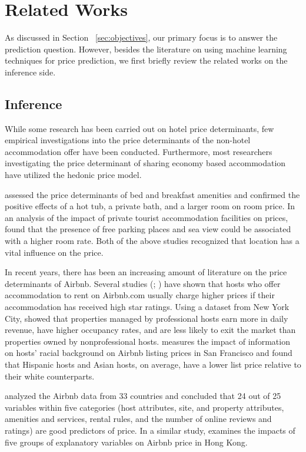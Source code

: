 \section{Related Works}

As discussed in Section ~\ref{sec:objectives}, our primary focus is to answer
the prediction question. However, besides the literature on using machine
learning techniques for price prediction, we first briefly review the related
works on the inference side.

\subsection{Inference}

While some research has been carried out on hotel price determinants, few
empirical investigations into the price determinants of the non-hotel
accommodation offer have been conducted.  Furthermore, most researchers
investigating the price determinant of sharing economy based accommodation have
utilized the hedonic price model.

\textcite{monty2003hedonic} assessed the price determinants of bed and breakfast
amenities and confirmed the positive effects of a hot tub, a private bath, and a
larger room on room price.  In an analysis of the impact of private tourist
accommodation facilities on prices, \textcite{portolan2013impact} found that the
presence of free parking places and sea view could be associated with a higher
room rate.  Both of the above studies recognized that location has a vital
influence on the price.

In recent years, there has been an increasing amount of literature on the price
determinants of Airbnb.  Several studies (\textcite{gutt2015sharing};
\textcite{ikkala2014defining} ) have shown that hosts who offer accommodation to
rent on Airbnb.com usually charge higher prices if their accommodation has
received high star ratings.  Using a dataset from New York City,
\textcite{li2016pros,} showed that properties managed by professional hosts earn
more in daily revenue, have higher occupancy rates, and are less likely to exit
the market than properties owned by nonprofessional hosts.
\textcite{kakar2016effects} measures the impact of information on hosts’ racial
background on Airbnb listing prices in San Francisco and found that Hispanic
hosts and Asian hosts, on average, have a lower list price relative to their
white counterparts.

\textcite{wang2017price} analyzed the Airbnb data from 33 countries and concluded
that 24 out of 25 variables within five categories (host attributes, site, and
property attributes, amenities and services, rental rules, and the number of
online reviews and ratings) are good predictors of price.  In a similar study,
\textcite{cai2019price} examines the impacts of five groups of
explanatory variables on Airbnb price in Hong Kong.


